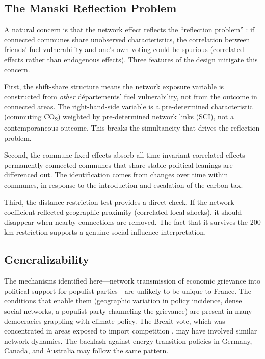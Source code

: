 \documentclass[12pt]{article}
\newcommand{\depts}{d\'{e}partements}
\begin{document}
\subsection{The Manski Reflection Problem}

A natural concern is that the network effect reflects the ``reflection problem'' \citep{manski1993identification}: if connected communes share unobserved characteristics, the correlation between friends' fuel vulnerability and one's own voting could be spurious (correlated effects rather than endogenous effects). Three features of the design mitigate this concern.

First, the shift-share structure means the network exposure variable is constructed from \emph{other} \depts{}' fuel vulnerability, not from the outcome in connected areas. The right-hand-side variable is a pre-determined characteristic (commuting CO\textsubscript{2}) weighted by pre-determined network links (SCI), not a contemporaneous outcome. This breaks the simultaneity that drives the reflection problem.

Second, the commune fixed effects absorb all time-invariant correlated effects---permanently connected communes that share stable political leanings are differenced out. The identification comes from changes over time within communes, in response to the introduction and escalation of the carbon tax.

Third, the distance restriction test provides a direct check. If the network coefficient reflected geographic proximity (correlated local shocks), it should disappear when nearby connections are removed. The fact that it survives the 200 km restriction supports a genuine social influence interpretation.

\subsection{Generalizability}

The mechanisms identified here---network transmission of economic grievance into political support for populist parties---are unlikely to be unique to France. The conditions that enable them (geographic variation in policy incidence, dense social networks, a populist party channeling the grievance) are present in many democracies grappling with climate policy. The Brexit vote, which was concentrated in areas exposed to import competition \citep{colantone2018trade, fetzer2019did}, may have involved similar network dynamics. The backlash against energy transition policies in Germany, Canada, and Australia may follow the same pattern.
\end{document}
